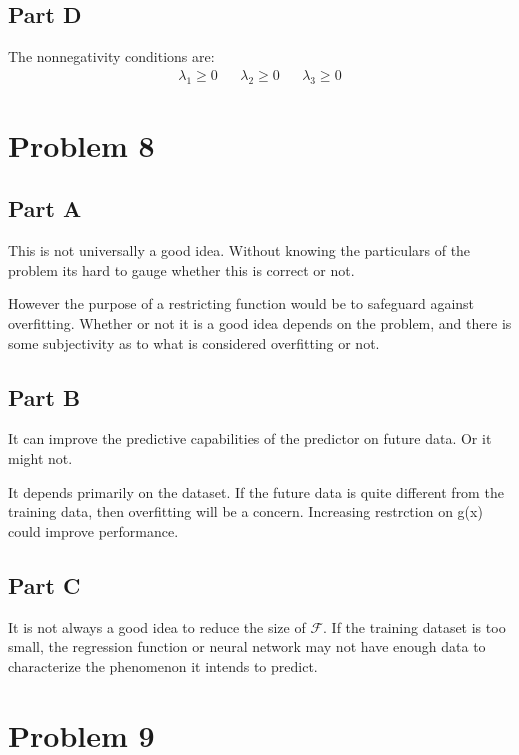\documentclass{article}
\begin{document}
\subsection*{Part D}
The nonnegativity conditions are:
\begin{align*}
\boxed{ \lambda_1 \geq 0 } &&\boxed{ \lambda_2 \geq 0 }&& \boxed{ \lambda_3 \geq 0 }
\end{align*}
\clearpage

\section*{Problem 8}
\subsection*{Part A}

This is not universally a good idea. Without knowing the particulars of the problem its hard to gauge whether this is correct or not.

However the purpose of a restricting function would be to safeguard against overfitting. Whether or not it is a good idea depends on the problem, and there is some subjectivity as to what is considered overfitting or not.
\subsection*{Part B}

It can improve the predictive capabilities of the predictor on future data. Or it might not.

It depends primarily on the dataset. If the future data is quite different from the training data, then overfitting will be a concern. Increasing restrction on g(x) could improve performance.

\subsection*{Part C}

It is not always a good idea to reduce the size of $\mathcal{F}$. If the training dataset is too small, the regression function or neural network may not have enough data to characterize the phenomenon it intends to predict.

\clearpage

\section*{Problem 9}
\end{document}
